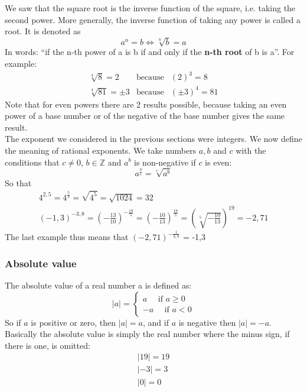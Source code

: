 \noindent We saw that the square root is the inverse function of the square, i.e. taking the second power. More generally, the inverse function of taking any power is called a root. It is denoted as
$$
a^n = b \Leftrightarrow \sqrt[n]{b} = a
$$
In words: "`if the n-th power of a is b if and only if the \textbf{n-th root} of b is a"'. For example:
\begin{eqnarray*}
\sqrt[3]{8} =  2 & \text{because} & \left(  2 \right)^3 = 8 \\
 \sqrt[4]{81} = \pm 3 & \text{because} & \left( \pm 3 \right)^4 = 81
\end{eqnarray*}
Note that for even powers there are 2 results possible, because taking an even power of a base number or of the negative of the base number gives the same result.\\

\noindent The exponent we considered in the previous sections were integers. We now define the meaning of rational exponents. We take numbers $a,b$ and $c$ with the conditions that $c \neq 0 $, $b \in \mathbb{Z}$ and $a^b$ is non-negative if $c$ is even:  
$$
a^{\frac{b}{c}} =  \sqrt[c]{a^b}
$$
So that
\begin{eqnarray*}
4^{2,5}=4^{\frac{5}{2}} = \sqrt{4^5} = \sqrt{1024} = 32 \\
\left( -1,3 \right)^{-3,8} = \left( - \frac{13}{10} \right)^{-\frac{19}{5}} = \left( - \frac{10}{13} \right)^{\frac{19}{5}} = \left( \sqrt[5]{-\frac{10}{13}} \right)^{19} = -2,71
\end{eqnarray*}
The last example thus means that $\left( -2,71 \right)^{-\frac{1}{3,8}}$ = -1,3

\subsubsection{Absolute value}

\noindent The absolute value of a real number a is defined as:
$$
|a| = \left\{ \begin{array}{ll}
                  a \ \ \ \ \ \  \text{if } a \geq 0 \\
                  -a \ \ \ \ \ \  \text{if } a < 0 
                \end{array}
              \right.
$$
So if $a$ is positive or zero, then $|a| = a$, and if $a$ is negative then $|a| = -a$. Basically the absolute value is simply the real number where the minus sign, if there is one, is omitted:
\begin{eqnarray*}
 |19| = 19 \\
|-3| = 3 \\
|0| = 0
\end{eqnarray*}

